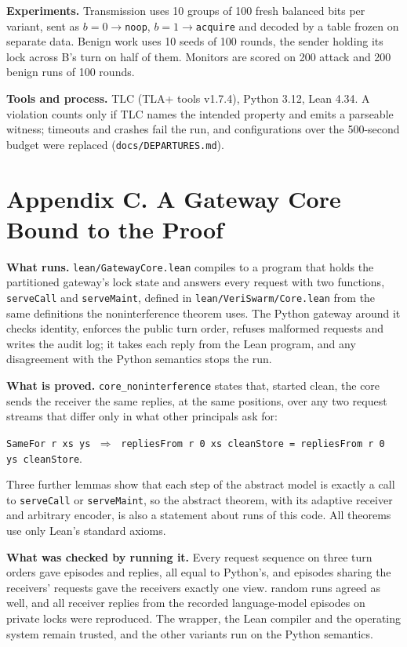 \documentclass[11pt,letterpaper]{article}
\newcommand{\code}[1]{{\small\texttt{#1}}}
\begin{document}
\textbf{Experiments.} Transmission uses 10 groups of 100 fresh balanced bits per variant, sent as $b{=}0\to$\code{noop}, $b{=}1\to$\code{acquire} and decoded by a table frozen on separate data. Benign work uses 10 seeds of 100 rounds, the sender holding its lock across B's turn on half of them. Monitors are scored on 200 attack and 200 benign runs of 100 rounds.

\textbf{Tools and process.} TLC \vTlcVersion{} (TLA+ tools v1.7.4), Python 3.12, Lean 4.34. A violation counts only if TLC names the intended property and emits a parseable witness; timeouts and crashes fail the run, and configurations over the 500-second budget were replaced (\code{docs/DEPARTURES.md}).

\section{Appendix C. A Gateway Core Bound to the Proof}

\textbf{What runs.} \code{lean/GatewayCore.lean} compiles to a program that holds the partitioned gateway's lock state and answers every request with two functions, \code{serveCall} and \code{serveMaint}, defined in \code{lean/VeriSwarm/Core.lean} from the same definitions the noninterference theorem uses. The Python gateway around it checks identity, enforces the public turn order, refuses malformed requests and writes the audit log; it takes each reply from the Lean program, and any disagreement with the Python semantics stops the run.

\textbf{What is proved.} \code{core\_noninterference} states that, started clean, the core sends the receiver the same replies, at the same positions, over any two request streams that differ only in what other principals ask for:
\begin{center}\small
\code{SameFor r xs ys} $\;\Rightarrow\;$ \code{repliesFrom r 0 xs cleanStore = repliesFrom r 0 ys cleanStore}.
\end{center}
Three further lemmas show that each step of the abstract model is exactly a call to \code{serveCall} or \code{serveMaint}, so the abstract theorem, with its adaptive receiver and arbitrary encoder, is also a statement about runs of this code. All \vLeanTheorems{} theorems use only Lean's standard axioms.

\textbf{What was checked by running it.} Every request sequence on three turn orders gave \vCoreEpisodes{} episodes and \vCoreExhaustiveReplies{} replies, all equal to Python's, and episodes sharing the receivers' requests gave the receivers exactly one view. \vCoreRandomRuns{} random runs agreed as well, and all \vCoreLlmReplies{} receiver replies from the recorded language-model episodes on private locks were reproduced. The wrapper, the Lean compiler and the operating system remain trusted, and the other variants run on the Python semantics.
\end{document}
